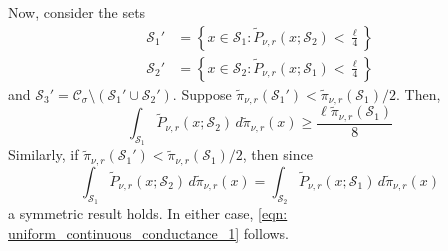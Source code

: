 \documentclass[11pt,twoside]{article}
\newcommand{\set}[1]{\left\{#1\right\}}
\newcommand{\1}{\mathbf{1}}
\newcommand{\Sset}{\mathcal{S}}
\newcommand{\Cset}{\mathcal{C}}
\newcommand{\Csig}{\Cset_{\sigma}}
\begin{document}
Now, consider the sets
\begin{align*}
\Sset_1' & = \set{x \in \Sset_1: \widetilde{P}_{\nu,r}(x; \Sset_2) < \frac{\ell}{4}} \\
\Sset_2' & = \set{x \in \Sset_2: \widetilde{P}_{\nu,r}(x; \Sset_1) < \frac{\ell}{4}}
\end{align*}
and $\Sset_3' = \Csig \setminus (\Sset_1' \cup \Sset_2')$. Suppose $\widetilde{\pi}_{\nu,r}(\Sset_1') < \widetilde{\pi}_{\nu,r}(\Sset_1)/2$. Then,
\begin{equation*}
\int_{\Sset_1} \widetilde{P}_{\nu,r}(x; \Sset_2) \,d\widetilde{\pi}_{\nu,r}(x) \geq \frac{\ell \widetilde{\pi}_{\nu,r}(\Sset_1)}{8}
\end{equation*}
Similarly, if $\widetilde{\pi}_{\nu,r}(\Sset_1') < \widetilde{\pi}_{\nu,r}(\Sset_1)/2$, then since
\begin{equation*}
\int_{\Sset_1} \widetilde{P}_{\nu,r}(x; \Sset_2) \,d\widetilde{\pi}_{\nu,r}(x) = \int_{\Sset_2} \widetilde{P}_{\nu,r}(x; \Sset_1) \,d\widetilde{\pi}_{\nu,r}(x)
\end{equation*}
a symmetric result holds. In either case, \eqref{eqn: uniform_continuous_conductance_1} follows.
\end{document}
